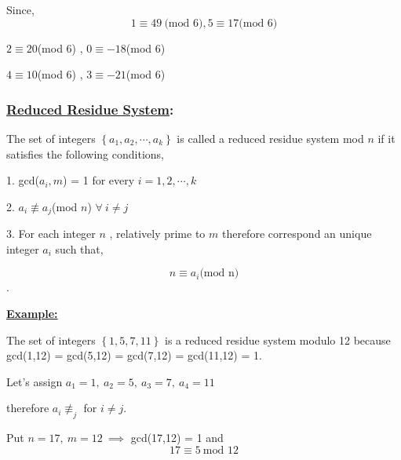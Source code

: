 \documentclass[a4paper,12pt]{article}
\begin{document}
    Since,  $$1\equiv 49\ \mbox{(mod 6)}   ,    5\equiv 17\mbox{(mod 6)}$$
    \begin{center}
        $2\equiv 20$(mod 6)   ,    $0\equiv -18$(mod 6)
    \end{center}
    
    \begin{center}
        $4\equiv 10$(mod 6)   ,    $3\equiv -21$(mod 6)
    \end{center}

    \subsubsection*{\underline{{\bf Reduced Residue System}}:}

    The set of integers $\left\{a_1,a_2,\cdots ,a_k\right\}$ is called a reduced residue system mod $n$ if it satisfies the following conditions,

    \vspace*{0.3cm}

    1. gcd($a_i,m$) = 1      for every $i = 1,2,\cdots ,k$

    \vspace*{0.3cm}

    2. $a_i \not\equiv a_j$(mod $n$) $\forall\ i\neq j$

    \vspace*{0.3cm}

    3. For each integer $n$ , relatively prime to $m$ therefore correspond an unique integer $a_i$ such that,

    $$n\equiv a_i\mbox{(mod n)}$$.

    \pagebreak

    \underline{{\bf Example:}}
    \vspace*{0.3cm}

    The set of integers $\left\{1,5,7,11\right\}$ is a reduced residue system modulo 12 because gcd(1,12) = gcd(5,12) = gcd(7,12) = gcd(11,12) = 1.

    \vspace*{0.3cm}

    Let's assign $a_1 = 1,\ a_2 = 5,\ a_3 = 7,\ a_4 = 11$


    \vspace*{0.3cm}
    therefore $a_i\not\equiv_j$  for $i\neq j.$


    \vspace*{0.3cm}

    Put $n = 17,\ m = 12\ \implies$ gcd(17,12) = 1 and
    $$17\equiv 5\ \mbox{mod 12}$$
\end{document}
